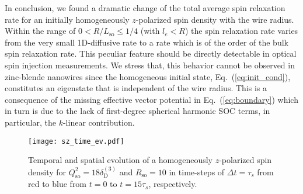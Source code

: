 \documentclass[superscriptaddress,noshowpacs,noshowkeys, twocolumn, floatfix,aps, prb,reprint]{revtex4-1}
\begin{document}
In conclusion, we found a dramatic change of the total average spin relaxation rate for an initially homogeneously $z$-polarized spin density with the wire radius. 
Within the range of ${0< R/L_\text{so} \leq 1/4}$ (with $l_e< R$) the spin relaxation rate varies from the very small 1D-diffusive rate to a rate which is of the order of the bulk spin relaxation rate.
This peculiar feature should be directly detectable in optical spin  injection measurements.\cite{Furthmeier2016}
We stress that, this behavior cannot be observed in zinc-blende nanowires since the homogeneous initial state, Eq.~(\ref{eq:init_cond}), constitutes an eigenstate that is independent of the wire radius.\cite{Kammermeier2017}
This is a consequence of the missing effective vector potential in Eq.~(\ref{eq:boundary}) which in turn is due to the lack of first-degree spherical harmonic SOC terms, in particular, the $k$-linear contribution.



\begin{figure}[t]
\texttt{[image: sz\_time\_ev.pdf]}
\caption{Temporal and spatial evolution of a homogeneously $z$-polarized spin density for $Q_\text{so}^2=18\delta_\text{D}^{(3)}$ and $R_\text{so}=10$ in time-steps of $\Delta t=\tau_s$ from red to blue from $t=0$ to $t=15 \tau_s$, respectively. }
\label{fig:sz_time_ev}
\end{figure}
\end{document}
